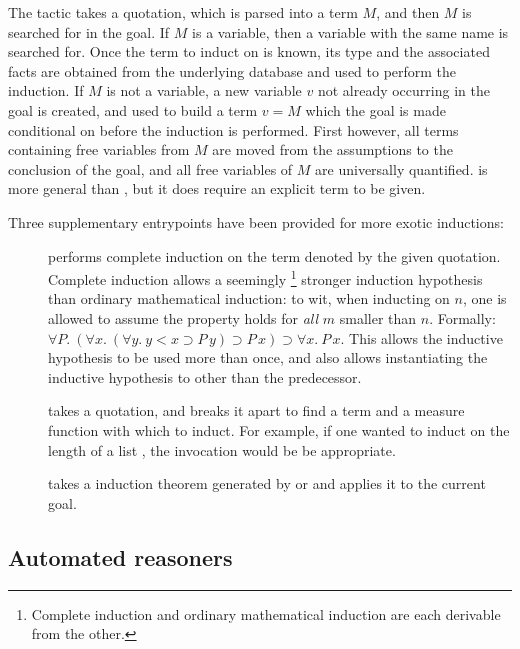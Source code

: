 {The  tactic takes a quotation, which is parsed into a
term $M$, and then $M$ is searched for in the goal. If $M$ is a
variable, then a variable with the same name is searched for. Once the
term to induct on is known, its type and the associated facts are
obtained from the underlying database and used to perform the
induction.  If $M$ is not a variable, a new variable $v$ not already
occurring in the goal is created, and used to build a term $v = M$
which the goal is made conditional on before the induction is
performed. First however, all terms containing free variables from $M$
are moved from the assumptions to the conclusion of the goal, and all
free variables of $M$ are universally quantified.  is
more general than , but it does require an explicit term to
be given.

Three supplementary entrypoints have been provided for more exotic
inductions:
\begin{description}
\item [] performs complete induction on the
  term denoted by the given quotation. Complete induction allows a
  seemingly \footnote{Complete induction and ordinary mathematical
    induction are each derivable from the other.} stronger induction
  hypothesis than ordinary mathematical induction: to wit, when
  inducting on $n$, one is allowed to assume the property holds for
  \emph{all} $m$ smaller than $n$. Formally: $\forall P.\ (\forall x.\
  (\forall y.\ y < x \supset P\, y) \supset P\,x) \supset \forall x.\
  P\,x$. This allows the inductive hypothesis to be used more than
  once, and also allows instantiating the inductive hypothesis to
  other than the predecessor.

\item [] takes a quotation, and breaks it
  apart to find a term and a measure function with which to induct.
  For example, if one wanted to induct on the length of a list
  \holtxt{L}, the invocation \ml{measureInduct\_on~`LENGTH L`}
  would be be appropriate.

\item [] takes a induction theorem generated by
 or  and applies it to the current goal.

\end{description}


\subsection{Automated reasoners}
\label{sec:automated-reasoners}

}

